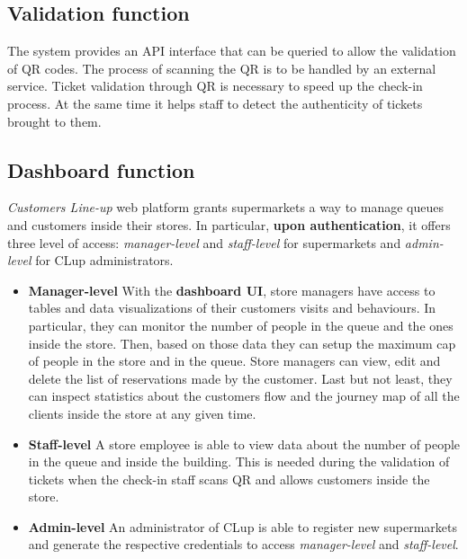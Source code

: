 \subsection{Validation function}
The system provides an API interface that can be queried to allow the validation of QR codes. The process of scanning the QR is to be handled by an external service.\newline
Ticket validation through QR is necessary to speed up the check-in process. At the same time it helps staff to detect the authenticity of tickets brought to them.

\subsection{Dashboard function}
\textit{Customers Line-up} web platform grants supermarkets a way to manage queues and customers inside their stores. In particular, \textbf{upon authentication}, it offers three level of access: \textit{manager-level} and \textit{staff-level} for supermarkets and \textit{admin-level} for CLup administrators.

\begin{itemize}
	\item \textbf{Manager-level}\newline
	With the \textbf{dashboard UI}, store managers have access to tables and data visualizations of their customers visits and behaviours. In particular, they can monitor the number of people in the queue and the ones inside the store. Then, based on those data they can setup the maximum cap of people in the store and in the queue.\newline
	Store managers can view, edit and delete the list of reservations made by the customer.\newline
	Last but not least, they can inspect statistics about the customers flow and the journey map of all the clients inside the store at any given time.

	\item \textbf{Staff-level}\newline
	A store employee is able to view data about the number of people in the queue and inside the building. This is needed during the validation of tickets when the check-in staff scans QR and allows customers inside the store.

    \item \textbf{Admin-level}\newline
    An administrator of CLup is able to register new supermarkets and generate the respective credentials to access \textit{manager-level} and \textit{staff-level}.
\end{itemize}

